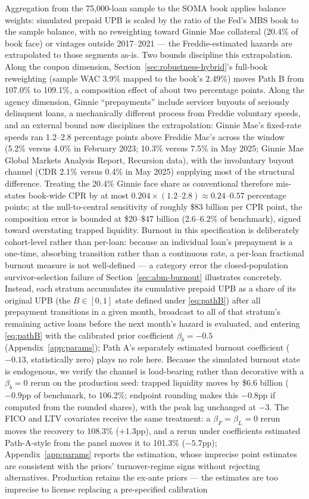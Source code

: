 \documentclass[12pt]{article}
\begin{document}
Aggregation from the 75,000-loan sample to the SOMA book applies balance weights: simulated prepaid UPB is scaled by the ratio of the Fed's MBS book to the sample balance, with no reweighting toward Ginnie Mae collateral (20.4\% of book face) or vintages outside 2017--2021 --- the Freddie-estimated hazards are extrapolated to those segments as-is. Two bounds discipline this extrapolation. Along the coupon dimension, Section~\ref{sec:robustness-hybrid}'s full-book reweighting (sample WAC 3.9\% mapped to the book's 2.49\%) moves Path B from 107.0\% to 109.1\%, a composition effect of about two percentage points. Along the agency dimension, Ginnie ``prepayments'' include servicer buyouts of seriously delinquent loans, a mechanically different process from Freddie voluntary speeds, and an external bound now disciplines the extrapolation: Ginnie Mae's fixed-rate speeds ran 1.2--2.8 percentage points above Freddie Mac's across the window (5.2\% versus 4.0\% in February 2023; 10.3\% versus 7.5\% in May 2025; Ginnie Mae Global Markets Analysis Report, Recursion data), with the involuntary buyout channel (CDR 2.1\% versus 0.4\% in May 2025) supplying most of the structural difference. Treating the 20.4\% Ginnie face share as conventional therefore mis-states book-wide CPR by at most $0.204 \times (1.2\text{--}2.8) \approx 0.24$--$0.57$ percentage points; at the null-to-central sensitivity of roughly \$83 billion per CPR point, the composition error is bounded at \$20--\$47 billion (2.6--6.2\% of benchmark), signed toward overstating trapped liquidity. Burnout in this specification is deliberately cohort-level rather than per-loan: because an individual loan's prepayment is a one-time, absorbing transition rather than a continuous rate, a per-loan fractional burnout measure is not well-defined --- a category error the closed-population survivor-selection failure of Section~\ref{sec:abm-burnout} illustrates concretely. Instead, each stratum accumulates its cumulative prepaid UPB as a share of its original UPB (the $B \in [0,1]$ state defined under \eqref{eq:pathB}) after all prepayment transitions in a given month, broadcast to all of that stratum's remaining active loans before the next month's hazard is evaluated, and entering \eqref{eq:pathB} with the calibrated prior coefficient $\beta_b = -0.5$ (Appendix~\ref{app:params}); Path A's separately estimated burnout coefficient ($-0.13$, statistically zero) plays no role here. Because the simulated burnout state is endogenous, we verify the channel is load-bearing rather than decorative with a $\beta_b = 0$ rerun on the production seed: trapped liquidity moves by \$6.6 billion ($-0.9$pp of benchmark, to 106.2\%; endpoint rounding makes this $-0.8$pp if computed from the rounded shares), with the peak lag unchanged at $-3$. The FICO and LTV covariates receive the same treatment: a $\beta_F = \beta_L = 0$ rerun moves the recovery to 108.3\% ($+1.3$pp), and a rerun under coefficients estimated Path-A-style from the panel moves it to 101.3\% ($-5.7$pp); Appendix~\ref{app:params} reports the estimation, whose imprecise point estimates are consistent with the priors' turnover-regime signs without rejecting alternatives. Production retains the ex-ante priors --- the estimates are too imprecise to license replacing a pre-specified calibration 
\end{document}
